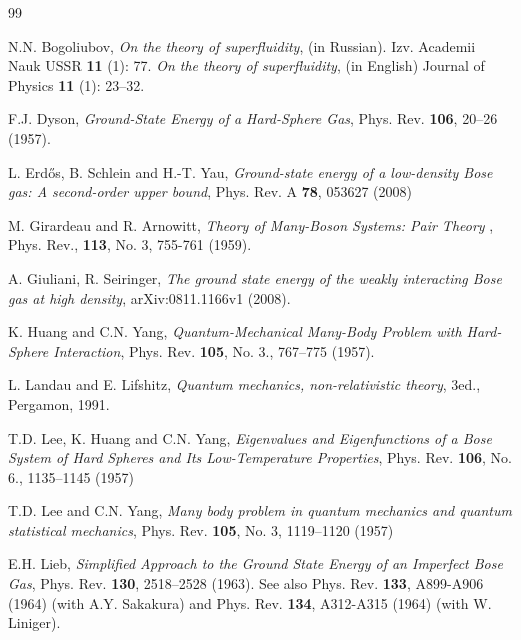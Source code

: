 \documentclass[11pt]{article}
\numberwithin{equation}{section}
\theoremstyle{definition}
\begin{document}
\begin{thebibliography}{99}



 N.N. Bogoliubov, {\it On the theory of superfluidity}, (in Russian). Izv. Academii Nauk USSR \textbf{11} (1): 77.  {\it On the theory of superfluidity}, (in English) Journal of Physics \textbf{11} (1): 23--32.


 F.J. Dyson, {\it Ground-State Energy of a Hard-Sphere Gas},
Phys. Rev. \textbf{106}, 20--26 (1957).



 L. Erd{\H o}s, B. Schlein and H.-T. Yau, {\it Ground-state energy of a low-density Bose gas: A second-order upper bound}, Phys. Rev. A \textbf{78}, 053627 (2008)

 M. Girardeau and R. Arnowitt, {\it Theory of Many-Boson Systems: Pair Theory }, Phys. Rev., {\bf 113}, No. 3, 755-761 (1959).

 A. Giuliani, R. Seiringer, {\it The ground state energy of the weakly interacting Bose gas at high density},  arXiv:0811.1166v1 (2008).

 K. Huang and C.N. Yang, {\it Quantum-Mechanical Many-Body Problem with Hard-Sphere Interaction}, Phys. Rev. {\bf 105}, No. 3., 767--775 (1957).


 L. Landau and E. Lifshitz,   {\it Quantum mechanics,  non-relativistic theory}, 3ed., Pergamon, 1991.


 T.D. Lee, K. Huang and C.N. Yang, {\it Eigenvalues and Eigenfunctions of a Bose System of Hard Spheres and Its Low-Temperature Properties}, Phys. Rev. {\bf 106}, No. 6., 1135--1145 (1957)


 T.D. Lee and C.N. Yang, {\it Many body problem in quantum mechanics and quantum statistical mechanics}, Phys. Rev. {\bf 105}, No. 3, 1119--1120 (1957)

 E.H. Lieb, {\it Simplified Approach to the Ground State
Energy of an Imperfect Bose Gas}, Phys. Rev. {\bf 130}, 2518--2528
(1963). See also  Phys. Rev. {\bf 133}, A899-A906 (1964) (with A.Y.
Sakakura) and Phys. Rev. {\bf 134}, A312-A315 (1964) (with W. Liniger).





\end{thebibliography}
\end{document}

